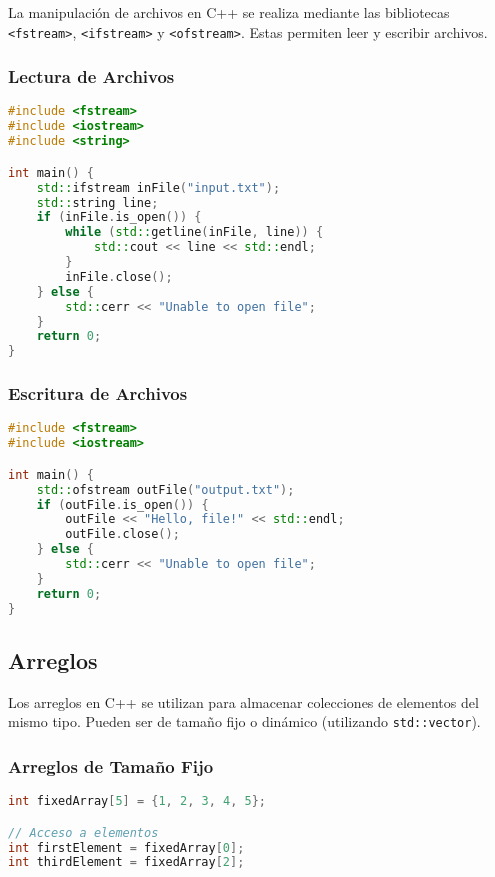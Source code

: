 La manipulación de archivos en C++ se realiza mediante las bibliotecas \texttt{<fstream>}, \texttt{<ifstream>} y \texttt{<ofstream>}. Estas permiten leer y escribir archivos.

\subsubsection{Lectura de Archivos}

\begin{lstlisting}[language=C++]
#include <fstream>
#include <iostream>
#include <string>

int main() {
    std::ifstream inFile("input.txt");
    std::string line;
    if (inFile.is_open()) {
        while (std::getline(inFile, line)) {
            std::cout << line << std::endl;
        }
        inFile.close();
    } else {
        std::cerr << "Unable to open file";
    }
    return 0;
}
\end{lstlisting}

\subsubsection{Escritura de Archivos}

\begin{lstlisting}[language=C++]
#include <fstream>
#include <iostream>

int main() {
    std::ofstream outFile("output.txt");
    if (outFile.is_open()) {
        outFile << "Hello, file!" << std::endl;
        outFile.close();
    } else {
        std::cerr << "Unable to open file";
    }
    return 0;
}
\end{lstlisting}

\subsection{Arreglos}

Los arreglos en C++ se utilizan para almacenar colecciones de elementos del mismo tipo. Pueden ser de tamaño fijo o dinámico (utilizando \texttt{std::vector}).

\subsubsection{Arreglos de Tamaño Fijo}

\begin{lstlisting}[language=C++]
int fixedArray[5] = {1, 2, 3, 4, 5};

// Acceso a elementos
int firstElement = fixedArray[0];
int thirdElement = fixedArray[2];
\end{lstlisting}

